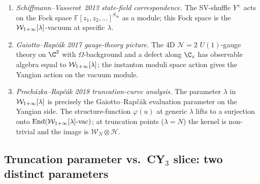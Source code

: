 \begin{verification}
\label{opus:verif:yangian-to-Winf}
\mbox{}
\begin{enumerate}
\item \emph{Schiffmann--Vasserot~2013 state-field correspondence.} The SV-shuffle $Y^+$
acts on the Fock space $\mathbb{F}[z_1, z_2, \ldots]^{S_\infty}$ as a module;
this Fock space is the $\mathcal{W}_{1+\infty}[\lambda]$-vacuum at specific $\lambda$.
\item \emph{Gaiotto--Rap\v c\'ak 2017 gauge-theory picture.} The 4D $\mathcal{N} = 2$
$U(1)$-gauge theory on $\C^2$ with $\Omega$-background and a defect along $\C_z$
has observable algebra equal to $\mathcal{W}_{1+\infty}[\lambda]$; the instanton moduli space
action gives the Yangian action on the vacuum module.
\item \emph{Proch\'azka--Rap\v c\'ak 2018 truncation-curve analysis.} The parameter
$\lambda$ in $\mathcal{W}_{1+\infty}[\lambda]$ is precisely the Gaiotto--Rap\v c\'ak evaluation
parameter on the Yangian side. The structure-function $\varphi(u)$ at generic $\lambda$
lifts to a surjection onto $\mathrm{End}(\mathcal{W}_{1+\infty}[\lambda]\text{-vac})$; at truncation
points ($\lambda = N$) the kernel is non-trivial and the image is $\mathcal{W}_N \otimes
\mathcal{H}$.
\end{enumerate}
\end{verification}

\subsection{Truncation parameter vs.\ CY$_3$ slice: two distinct parameters}
\label{opus:sec:lambda-vs-cy3}

